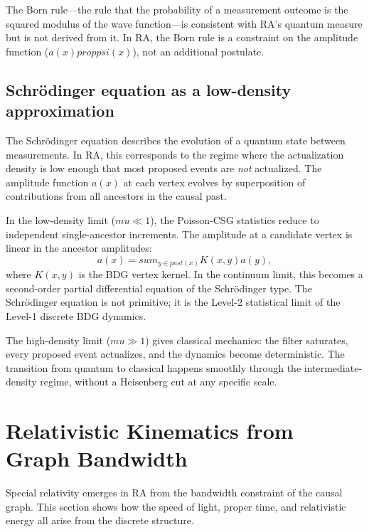 \documentclass[11pt]{article}
\def\mu{mu}%
\def\psi{psi}%
\def\mathrm#1{#1}%
\def\sum{sum}%
\def\propto{prop}%
\begin{document}
The Born rule---the rule that the probability of a measurement outcome is the squared modulus of the wave function---is consistent with RA's quantum measure but is not derived from it. In RA, the Born rule is a constraint on the amplitude function ($a(x)\propto\psi(x)$), not an additional postulate.

\subsection{Schr\"odinger equation as a low-density approximation}
\label{sec:schrodinger_limit}

The Schr\"odinger equation describes the evolution of a quantum state between measurements. In RA, this corresponds to the regime where the actualization density is low enough that most proposed events are \emph{not} actualized. The amplitude function $a(x)$ at each vertex evolves by superposition of contributions from all ancestors in the causal past.

In the low-density limit ($\mu \ll 1$), the Poisson-CSG statistics reduce to independent single-ancestor increments. The amplitude at a candidate vertex is linear in the ancestor amplitudes:
\begin{equation}
a(x) = \sum_{y \in \mathrm{past}(x)} K(x, y) a(y),
\end{equation}
where $K(x, y)$ is the BDG vertex kernel. In the continuum limit, this becomes a second-order partial differential equation of the Schr\"odinger type. The Schr\"odinger equation is not primitive; it is the Level-2 statistical limit of the Level-1 discrete BDG dynamics.

The high-density limit ($\mu \gg 1$) gives classical mechanics: the filter saturates, every proposed event actualizes, and the dynamics become deterministic. The transition from quantum to classical happens smoothly through the intermediate-density regime, without a Heisenberg cut at any specific scale.

\section{Relativistic Kinematics from Graph Bandwidth}
\label{sec:relativistic}

Special relativity emerges in RA from the bandwidth constraint of the causal graph. This section shows how the speed of light, proper time, and relativistic energy all arise from the discrete structure.
\end{document}
